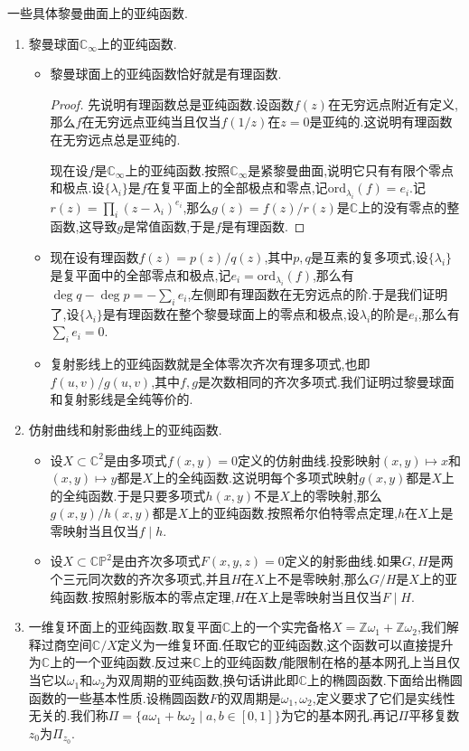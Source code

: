 一些具体黎曼曲面上的亚纯函数.
\begin{enumerate}
	\item 黎曼球面$\mathbb{C}_{\infty}$上的亚纯函数.
	\begin{itemize}
		\item 黎曼球面上的亚纯函数恰好就是有理函数.
		\begin{proof}
			
			先说明有理函数总是亚纯函数.设函数$f(z)$在无穷远点附近有定义,那么$f$在无穷远点亚纯当且仅当$f(1/z)$在$z=0$是亚纯的.这说明有理函数在无穷远点总是亚纯的.
			
			现在设$f$是$\mathbb{C}_{\infty}$上的亚纯函数.按照$\mathbb{C}_{\infty}$是紧黎曼曲面,说明它只有有限个零点和极点.设$\{\lambda_i\}$是$f$在复平面上的全部极点和零点,记$\mathrm{ord}_{\lambda_i}(f)=e_i$.记$r(z)=\prod_i(z-\lambda_i)^{e_i}$,那么$g(z)=f(z)/r(z)$是$\mathbb{C}$上的没有零点的整函数,这导致$g$是常值函数,于是$f$是有理函数.
		\end{proof}
		\item 现在设有理函数$f(z)=p(z)/q(z)$,其中$p,q$是互素的复多项式,设$\{\lambda_i\}$是复平面中的全部零点和极点,记$e_i=\mathrm{ord}_{\lambda_i}(f)$,那么有$\deg q-\deg p=-\sum_ie_i$,左侧即有理函数在无穷远点的阶.于是我们证明了,设$\{\lambda_i\}$是有理函数在整个黎曼球面上的零点和极点,设$\lambda_i$的阶是$e_i$,那么有$\sum_ie_i=0$.
		\item 复射影线上的亚纯函数就是全体零次齐次有理多项式,也即$f(u,v)/g(u,v)$,其中$f,g$是次数相同的齐次多项式.我们证明过黎曼球面和复射影线是全纯等价的.
	\end{itemize}
    \item 仿射曲线和射影曲线上的亚纯函数.
    \begin{itemize}
    	\item 设$X\subset\mathbb{C}^2$是由多项式$f(x,y)=0$定义的仿射曲线.投影映射$(x,y)\mapsto x$和$(x,y)\mapsto y$都是$X$上的全纯函数.这说明每个多项式映射$g(x,y)$都是$X$上的全纯函数.于是只要多项式$h(x,y)$不是$X$上的零映射,那么$g(x,y)/h(x,y)$都是$X$上的亚纯函数.按照希尔伯特零点定理,$h$在$X$上是零映射当且仅当$f\mid h$.
    	\item 设$X\subset\mathbb{CP}^2$是由齐次多项式$F(x,y,z)=0$定义的射影曲线.如果$G,H$是两个三元同次数的齐次多项式,并且$H$在$X$上不是零映射,那么$G/H$是$X$上的亚纯函数.按照射影版本的零点定理,$H$在$X$上是零映射当且仅当$F\mid H$.
    \end{itemize}
    \item 一维复环面上的亚纯函数.取复平面$\mathbb{C}$上的一个实完备格$X=\mathbb{Z}\omega_1+\mathbb{Z}\omega_2$,我们解释过商空间$\mathbb{C}/X$定义为一维复环面.任取它的亚纯函数,这个函数可以直接提升为$\mathbb{C}$上的一个亚纯函数.反过来$\mathbb{C}$上的亚纯函数$f$能限制在格的基本网孔上当且仅当它以$\omega_1$和$\omega_2$为双周期的亚纯函数,换句话讲此即$\mathbb{C}$上的椭圆函数.下面给出椭圆函数的一些基本性质.设椭圆函数$F$的双周期是$\omega_1,\omega_2$,定义要求了它们是实线性无关的.我们称$\Pi=\{a\omega_1+b\omega_2\mid a,b\in[0,1]\}$为它的基本网孔.再记$\Pi$平移复数$z_0$为$\Pi_{z_0}$.

\end{enumerate}
